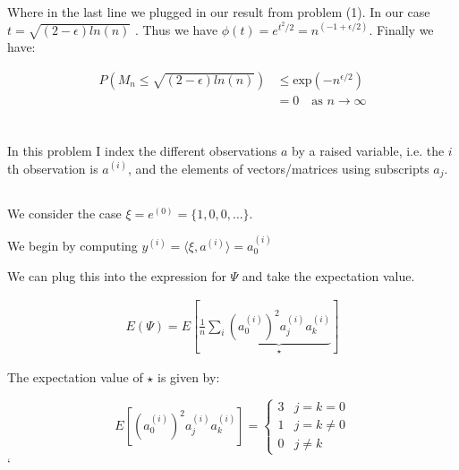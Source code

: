 \documentclass{article}
\begin{document}
Where in the last line we plugged in our result from problem (1). In our case $t= \sqrt{(2-\epsilon)ln(n)}$ . Thus we have $\phi(t) = e^{t^2/2} = n^{(-1 + \epsilon/2)}$. Finally we have:

\begin{equation}
	\begin{split}
		P \left( M_n \leq \sqrt{(2-\epsilon)ln(n)} \right) &\leq \text{exp} \left( -n^{\epsilon/2} \right) \\
								   & =0 \quad \text{as } n\rightarrow\infty 
\end{split}
\end{equation}






\section{}

In this problem I index the different observations $a$ by a raised variable, i.e. the $i$th observation is $a^{(i)}$, and the elements of vectors/matrices using subscripts $a_{j}$.

\subsection{}

We consider the case $\xi = e^{(0)} = \{1,0,0, \dots\}$. 

We begin by computing $y^{(i)} = \langle\xi, a^{(i)}\rangle = a^{(i)}_0$

We can plug this into the expression for $\Psi$ and take the expectation value.

\begin{equation}
\begin{split}
	E\left(\Psi\right)  = E\left[\frac{1}{n}\sum_{i}\underbrace{\left(a^{(i)}_0\right)^2a^{(i)}_ja^{(i)}_k}_{\star}\right]
\end{split}
\end{equation}

The expectation value of $\star$ is given by:

\begin{equation}
	E\left[\left(a^{(i)}_0\right)^2a^{(i)}_ja^{(i)}_k \right] = 
	\begin{cases}
		3 & j=k=0 \\
		1 & j=k\neq 0 \\
		0 & j\neq k
	\end{cases}
\end{equation}`
\end{document}
